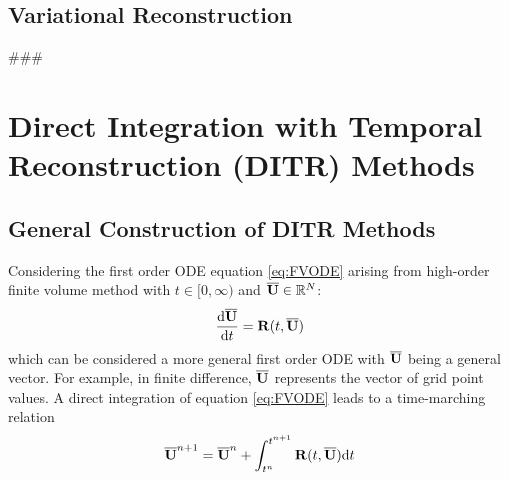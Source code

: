 \documentclass[preprint,12pt]{elsarticle}
\begin{document}
\subsection{Variational Reconstruction}
\label{ssec:VR}

\#\#\#


\section{Direct Integration with Temporal Reconstruction (DITR) Methods}
\label{sec:HIRK}

\subsection{General Construction of DITR Methods}

Considering the first order ODE equation \eqref{eq:FVODE} arising
from high-order finite volume method
with
$t\in[0,\infty)$ and $\overline{\mathbf{U}}\in \mathbb{R}^N$:
\begin{equation*}
    \frac{\dd \overline{\mathbf{U}}}{\dd t} = \mathbf{R}(t, \overline{\mathbf{U}})
\end{equation*}
which can be
considered a more general first order ODE with $\overline{\mathbf{U}}$ being
a general vector. For example, in finite difference,
$\overline{\mathbf{U}}$ represents the vector of grid point values.
A direct integration of equation \eqref{eq:FVODE}
leads to a time-marching relation
\begin{equation}
    \overline{\mathbf{U}}^{n+1} = \overline{\mathbf{U}}^{n} + \int_{t^n}^{t^{n+1}}{
    \mathbf{R}(t, \overline{\mathbf{U}}) \dd t
    }
    \label{eq:DI}
\end{equation}
\end{document}
